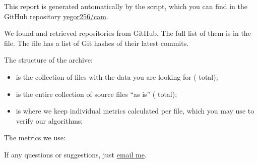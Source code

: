 \documentclass[nobrand,anonymous,nosecurity]{huawei}
\begin{document}
\maketitle

This report is generated automatically by the script, which you can find in
the GitHub repository \href{https://github.com/yegor256/cam}{yegor256/cam}.

We found and retrieved 
repositories from GitHub.
The full list of them is in the  file.
The  file has a list of Git hashes of their latest commits.


The structure of the archive:

\begin{itemize}
  \item {} is the collection of  files with the data
  you are looking for ( total);

  \item {} is the entire collection of
  source files ``as is''
  ( total);

  \item {} is where we keep individual metrics calculated
  per file, which you may use to verify our algorithms;
\end{itemize}

The metrics we use:

\begin{itemize}
  
\end{itemize}

If any questions or suggestions, just \href{mailto:yegor256@gmail.com}{email me}.
\end{document}
